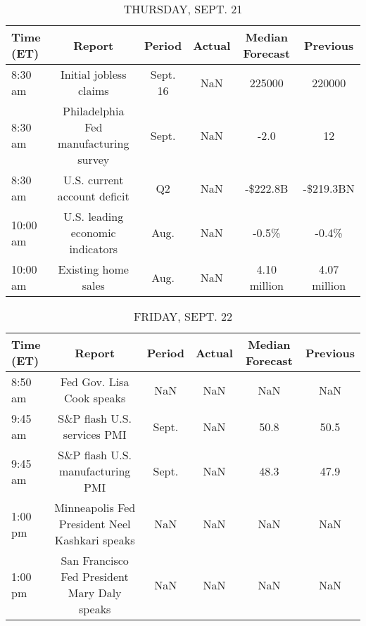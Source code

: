 \documentclass{article}%
\begin{document}
%


\begin{table}[htbp]%
\caption{THURSDAY, SEPT. 21}%
\centering%
\begin{adjustbox}{width=1\textwidth}%
\begin{tabular}{lccccc}
\toprule
Time (ET) &                                Report &   Period & Actual & Median Forecast &     Previous \\
\midrule
  8:30 am &                Initial jobless claims & Sept. 16 &    NaN &          225000 &       220000 \\
  8:30 am & Philadelphia Fed manufacturing survey &    Sept. &    NaN &            -2.0 &           12 \\
  8:30 am &          U.S. current account deficit &       Q2 &    NaN &        -\$222.8B &    -\$219.3BN \\
 10:00 am &      U.S. leading economic indicators &     Aug. &    NaN &           -0.5\% &        -0.4\% \\
 10:00 am &                   Existing home sales &     Aug. &    NaN &    4.10 million & 4.07 million \\
\bottomrule
\end{tabular}
%
\end{adjustbox}%
\end{table}

%


\begin{table}[htbp]%
\caption{FRIDAY, SEPT. 22}%
\centering%
\begin{adjustbox}{width=1\textwidth}%
\begin{tabular}{lccccc}
\toprule
Time (ET) &                                         Report & Period & Actual & Median Forecast & Previous \\
\midrule
  8:50 am &                      Fed Gov. Lisa Cook speaks &    NaN &    NaN &             NaN &      NaN \\
  9:45 am &                    S\&P flash U.S. services PMI &  Sept. &    NaN &            50.8 &     50.5 \\
  9:45 am &               S\&P flash U.S. manufacturing PMI &  Sept. &    NaN &            48.3 &     47.9 \\
  1:00 pm & Minneapolis Fed President Neel Kashkari speaks &    NaN &    NaN &             NaN &      NaN \\
  1:00 pm &   San Francisco Fed President Mary Daly speaks &    NaN &    NaN &             NaN &      NaN \\
\bottomrule
\end{tabular}
%
\end{adjustbox}%
\end{table}
\end{document}
